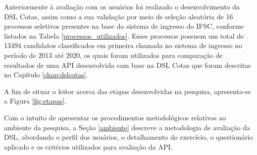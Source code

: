     Anteriormente à avaliação com os usuários foi realizado o desenvolvimento da DSL Cotas, assim como a sua validação por meio de seleção aleatória de 16 processos seletivos presentes na base do sistema de ingresso do \gls{IFSC}, conforme listados na Tabela \ref{processos_utilizados}. Esses processos possuem um total de 13494 candidatos classificados em primeira chamada no sistema de ingresso no período de 2013 até 2020, os quais foram utilizados para comparação de resultados de uma \gls{API} desenvolvida com base na DSL Cotas que foram descritas no Capítulo \ref{chap:dslcotas}.
    
    
    
    \newpage
    A fim de situar o leitor acerca das etapas desenvolvidas na pesquisa, apresenta-se a Figura \ref{fig:etapas}.
    
    
    
    
    Com o intuito de apresentar os procedimentos metodológicos relativos ao ambiente da pesquisa, a Seção \ref{ambiente} descreve a metodologia de avaliação da DSL, abordando o perfil dos usuários, o detalhamento do exercício, o questionário aplicado e os critérios utilizados para avaliação da \gls{API}. 
    
    
    
  